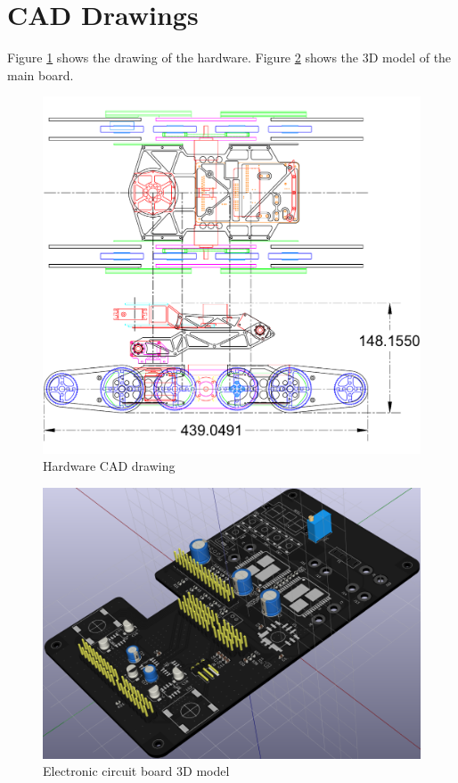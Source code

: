 \documentclass[journal]{IEEEtran}
\begin{document}
\section{CAD Drawings}
Figure \ref{fig:hardware} shows the drawing of the hardware.
Figure \ref{fig:main_3d} shows the 3D model of the main board.
\begin{figure}[!p]
    \centering
    \includegraphics[width=1.0\textwidth]{CAD.pdf}
    \caption{Hardware CAD drawing} \label{fig:hardware}
\end{figure}
\begin{figure}[!p]
    \centering
    \includegraphics[width=1.0\textwidth]{main.png}
    \caption{Electronic circuit board 3D model} \label{fig:main_3d}
\end{figure}
\end{document}
